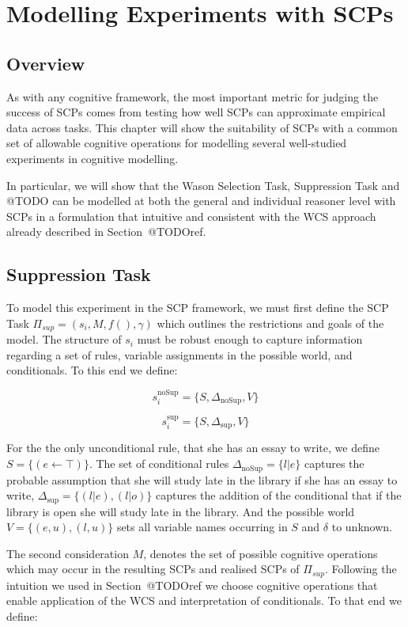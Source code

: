 \chapter{Modelling Experiments with SCPs} \label{chp:model}
\section{Overview}
As with any cognitive framework, the most important metric for judging the success of SCPs comes from testing how well SCPs can approximate empirical data across tasks. This chapter will show the suitability of SCPs with a common set of allowable cognitive operations for modelling several well-studied experiments in cognitive modelling.

In particular, we will show that the Wason Selection Task, Suppression Task and @TODO can be modelled at both the general and individual reasoner level with SCPs in a formulation that intuitive and consistent with the WCS approach already described in Section~@TODOref.
\section{Suppression Task} \label{sec:supSCP}



To model this experiment in the SCP framework, we must first define the SCP Task $\Pi_{sup}=(s_i,M,f(),\gamma)$ which outlines the restrictions and goals of the model. The structure of $s_i$ must be robust enough to capture information regarding a set of rules, variable assignments in the possible world, and conditionals. To this end we define:

\[s_i^\text{noSup}=\{S,\Delta_\text{noSup}, V\} \]

\[s_i^\text{sup}=\{S,\Delta_\text{sup}, V\} \]

For the the only unconditional rule, that she has an essay to write, we define $S=\{(e \leftarrow \top)\}$. The set of conditional rules $\Delta_{\text{noSup}}=\{l|e\}$ captures the probable assumption that she will study late in the library if she has an essay to write, $\Delta_{\text{sup}}=\{(l|e),(l|o)\}$ captures the addition of the conditional that if the library is open she will study late in the library. And the possible world $V=\{(e,u),(l,u)\}$ sets all variable names occurring in $S$ and $\delta$ to unknown.

The second consideration $M$, denotes the set of possible cognitive operations which may occur in the resulting SCPs and realised SCPs of $\Pi_{sup}$. Following the intuition we used in Section~@TODOref we choose cognitive operations that enable application of the WCS and interpretation of conditionals. To that end we define:

